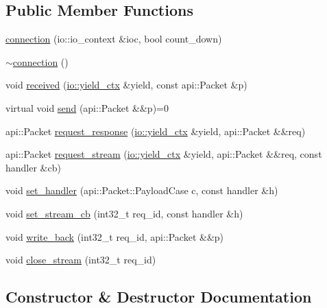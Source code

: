 \subsection*{Public Member Functions}
\begin{DoxyCompactItemize}
\item 
\hyperlink{classtelegraph_1_1connection_a6952fb62edd1c7e78fe8744d4eac7aaa}{connection} (io\+::io\+\_\+context \&ioc, bool count\+\_\+down)
\item 
\hyperlink{classtelegraph_1_1connection_a469b53662900132cfc89a595b1dab28c}{$\sim$connection} ()
\item 
void \hyperlink{classtelegraph_1_1connection_a6dd7c859165db61ecdd14a8e5bcc7fcf}{received} (\hyperlink{structboost_1_1asio_1_1yield__ctx}{io\+::yield\+\_\+ctx} \&yield, const api\+::\+Packet \&p)
\item 
virtual void \hyperlink{classtelegraph_1_1connection_ad5fd2c23680ecda6e07c2f02f3735809}{send} (api\+::\+Packet \&\&p)=0
\item 
api\+::\+Packet \hyperlink{classtelegraph_1_1connection_a5edeb1d722fad636d63f125d896e41c4}{request\+\_\+response} (\hyperlink{structboost_1_1asio_1_1yield__ctx}{io\+::yield\+\_\+ctx} \&yield, api\+::\+Packet \&\&req)
\item 
api\+::\+Packet \hyperlink{classtelegraph_1_1connection_a769414199f9cf151ff115f223f07fb5c}{request\+\_\+stream} (\hyperlink{structboost_1_1asio_1_1yield__ctx}{io\+::yield\+\_\+ctx} \&yield, api\+::\+Packet \&\&req, const handler \&cb)
\item 
void \hyperlink{classtelegraph_1_1connection_a07cd6d890aad0f708ca32d136e063937}{set\+\_\+handler} (api\+::\+Packet\+::\+Payload\+Case c, const handler \&h)
\item 
void \hyperlink{classtelegraph_1_1connection_ad3ec8072dd935d37eaac8cbc2390177d}{set\+\_\+stream\+\_\+cb} (int32\+\_\+t req\+\_\+id, const handler \&h)
\item 
void \hyperlink{classtelegraph_1_1connection_a5bf70bff51c2cd812f4f27b3e37e9060}{write\+\_\+back} (int32\+\_\+t req\+\_\+id, api\+::\+Packet \&\&p)
\item 
void \hyperlink{classtelegraph_1_1connection_a8c977ff1083d9457444cee0cc4fc1add}{close\+\_\+stream} (int32\+\_\+t req\+\_\+id)
\end{DoxyCompactItemize}


\subsection{Constructor \& Destructor Documentation}
\mbox{\label{classtelegraph_1_1connection_a6952fb62edd1c7e78fe8744d4eac7aaa}} 

